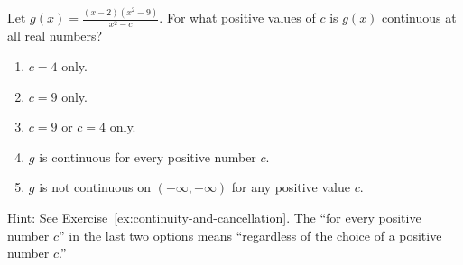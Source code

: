 \documentclass[../main.tex]{subfiles}
\begin{document}
\begin{exercise}
  Let \(g(x) = \frac{(x-2)(x^{2}-9)}{x^{2}-c}\). For what positive values of \(c\) is \(g(x)\) continuous at all real numbers?

  \begin{enumerate}[label=\Alph*.]
    \item \(c = 4\) only.
    \item \(c = 9\) only.
    \item \(c = 9\) or \(c = 4\) only.
    \item \(g\) is continuous for every positive number \(c\).
    \item \(g\) is not continuous on \((-\infty, +\infty)\) for any positive value \(c\).
  \end{enumerate}

  Hint: See Exercise~\ref{ex:continuity-and-cancellation}.  The ``for every positive number \(c\)'' in the last two options means ``regardless of the choice of a positive number \(c\).''
\end{exercise}

\vfill{}
\end{document}
